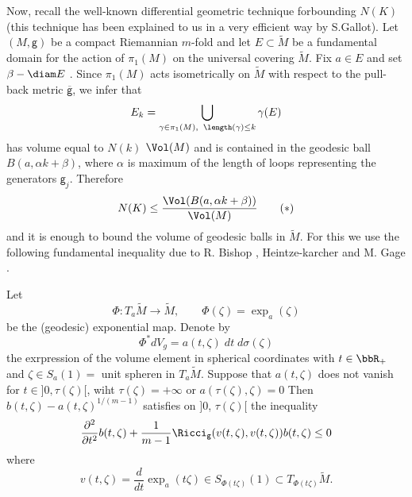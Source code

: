 Now, recall the well-known differential geometric technique for\break bounding $N(K)$ (this technique has been explained to us in a very efficient way by S.Gallot). Let $(M, \mathsf{g})$ be a compact Riemannian $m$-fold and let $E\subset \widetilde{M}$ be a fundamental domain for the action of $\pi_{1}(M)$ on the universal covering $\widetilde{M}$. Fix $a\in E$ and set $\beta - \diam E$ . Since $\pi_{1}(M)$ acts isometrically on $\widetilde{M}$ with respect to the pull-back metric $\overline{\mathsf{g}}$, we infer that
$$
E_{k} = \bigcup\limits_{\gamma\in \pi_{1}(M),\;\; \length(\gamma)\leq k} \gamma(E)
$$
has volume equal to $N(k)$ $\Vol(M)$ and is contained in the geodesic ball $B(a, \alpha k + \beta)$, where $\alpha$ is maximum of the length of loops representing the generators $\mathsf{g}_{j}$. Therefore
\begin{equation*}
N(K) \leq \dfrac{\Vol(B(a, \alpha k + \beta))}{\Vol(M)} \tag{$\ast$}\label{eq:sample2}
\end{equation*}
and it is enough to bound the volume of geodesic balls in $\widetilde{M}$. For this we use the following fundamental inequality due to R. Bishop \cite{art5-keyBi63}, Heintze-karcher \cite{art5-keyHK78} and M. Gage \cite{art5-keyGa80}.

\begin{lem}\label{art5-lem-2.7}
Let
$$
\Phi : T_{a}\widetilde{M} \rightarrow \widetilde{M},\qquad \Phi(\zeta)= \exp_{a}(\zeta)
$$
be the (geodesic) exponential map. Denote by
$$
\Phi^{*}dV_{g}= a(t, \zeta)\; dt\; d\sigma(\zeta)
$$
the exrpression of the volume element in spherical coordinates with $t \in \bbR_{+}$ and $\zeta \in S_{a}(1) =$ unit spheren in $T_{a}\widetilde{M}$. Suppose that $a(t, \zeta)$ does not vanish for $t \in ]0, \tau (\zeta)[$, wiht $\tau(\zeta) = + \infty$ or $a(\tau(\zeta), \zeta) = 0$ Then $b(t, \zeta) - a(t, \zeta)^{1/(m-1)}$ satisfies on $]0$, $\tau(\zeta)[$ the inequality
$$
\dfrac{\partial^{2}}{\partial t^{2}}b(t, \zeta) + \dfrac{1}{m-1}\Ricci_{\mathsf{g}}(v(t, \zeta), v(t, \zeta))b(t, \zeta)\leq 0
$$
where
$$
v(t, \zeta) = \dfrac{d}{dt}\exp_{a}(t\zeta)\in S_{\Phi(t\zeta)}(1) \subset T_{\Phi (t\zeta)}\widetilde{M}.
$$
\end{lem}

